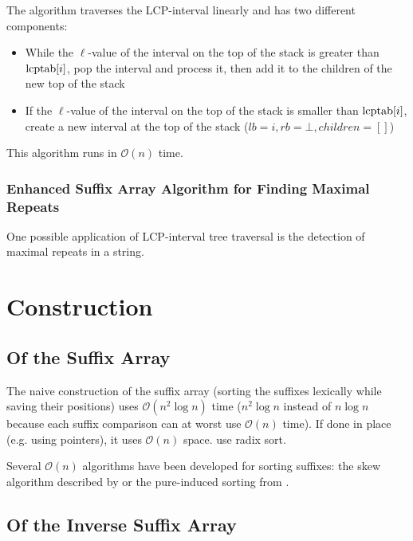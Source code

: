 \documentclass[a4paper,10pt]{article}
\begin{document}
The algorithm traverses the LCP-interval linearly and has two different
components:

\begin{itemize}
\item While the $\ell$-value of the interval on the top of the stack
is greater than $\hbox{lcptab}[i]$, pop the interval and process it,
then add it to the children of the new top of the stack
\item If the $\ell$-value of the interval on the top of the stack is
smaller than $\hbox{lcptab}[i]$, create a new interval at the top of
the stack ($lb=i, rb=\bot, children=[]$)
\end{itemize}

This algorithm runs in $\mathcal{O}(n)$ time.

\subsubsection*{Enhanced Suffix Array Algorithm for Finding Maximal Repeats}

One possible application of LCP-interval tree traversal is the detection
of maximal repeats in a string.


\section*{Construction}

\subsection*{Of the Suffix Array}

The naive construction of the suffix array (sorting the suffixes
lexically while saving their positions) uses $\mathcal{O}(n^2 \log n)$
time ($n^2 \log n$ instead of $n \log n$ because each suffix comparison
can at worst use $\mathcal{O}(n)$ time). If done in place (e.g. using
pointers), it uses $\mathcal{O}(n)$ space. \citealt{manber1993suffix} use
radix sort.

Several $\mathcal{O}(n)$ algorithms have been developed for sorting
suffixes: the skew algorithm described by \cite{karkkainen2003simple}
or the pure-induced sorting from \citealt{nong2009linear}. %

\subsection*{Of the Inverse Suffix Array}
\end{document}
